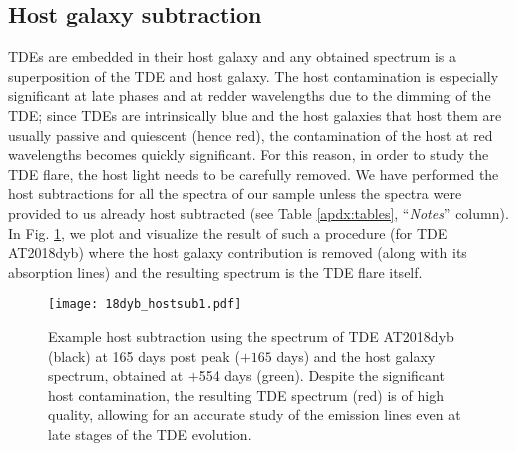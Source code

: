 \documentclass[structabstract]{aa}
\begin{document}
\subsection{Host galaxy subtraction} \label{subsub:hgs}
TDEs are embedded in their host galaxy and any obtained spectrum is a superposition of the TDE and host galaxy. The host contamination is especially significant at late phases and at redder wavelengths due to the dimming of the TDE; since TDEs are intrinsically blue and the host galaxies that host them are usually passive and quiescent (hence red), the contamination of the host at red wavelengths becomes quickly significant. For this reason, in order to study the TDE flare, the host light needs to be carefully removed. We have performed the host subtractions for all the spectra of our sample unless the spectra were provided to us already host subtracted (see Table \ref{apdx:tables}, ``\textit{Notes}'' column). In Fig. \ref{fig:hostgalsub}, we plot and visualize the result of such a procedure (for TDE AT2018dyb) where the host galaxy contribution is removed (along with its absorption lines) and the resulting spectrum is the TDE flare itself. 



\begin{figure}
\centering
\texttt{[image: 18dyb\_hostsub1.pdf]}
\caption{
Example host subtraction using the spectrum of TDE AT2018dyb (black) at 165 days post peak ($+165$ days) and the host galaxy spectrum, obtained at $+$554 days  (green). Despite the significant host contamination, the resulting TDE spectrum (red) is of high quality, allowing for an accurate study of the emission lines even at late stages of the TDE evolution.
}\label{fig:hostgalsub}
\end{figure}
\end{document}
